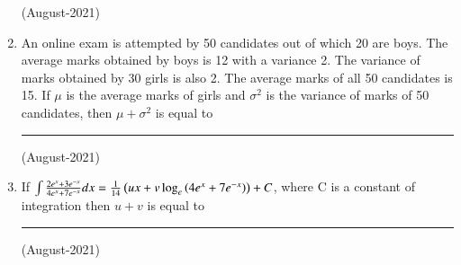 \documentclass[journal]{IEEEtran}
\begin{document}
\begin{enumerate}
    \hfill (August-2021)
    
    \item An online exam is attempted by 50 candidates out of which 20 are boys. The average marks obtained by boys is 12 with a variance 2. The variance of marks obtained by 30 girls is also 2. The average marks of all 50 candidates is 15. If $\mu$ is the average marks of girls and $\sigma ^2$
 is the variance of marks of 50 candidates, then 
$\mu + \sigma^2$ is equal to \rule{1.5cm}{0.15mm}

\hfill(August-2021)
\item If $\int \frac{2e^x + 3e^{-x}}{4e^x+ 7e^{-x}}dx = \frac{1}{14} \left(ux + v \log_e \left(4e^x + 7e^{-x}\right)\right) + C$, where C is a constant of integration then $u + v$ is equal to \rule{1cm}{0.15mm}

\hfill (August-2021)
\end{enumerate}
\end{document}
